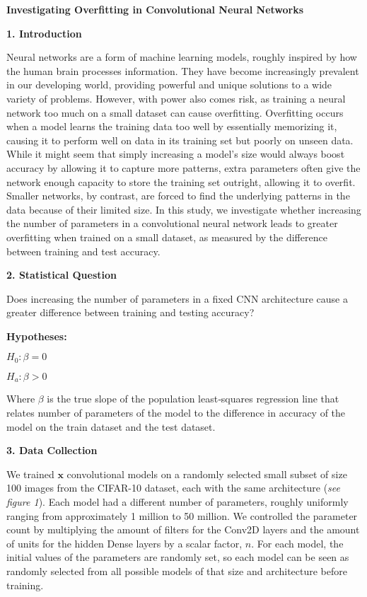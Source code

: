 \documentclass[12pt]{article}
\begin{document}
    \centerline{\textbf{Investigating Overfitting in Convolutional Neural Networks}}

    \noindent\textbf{1. Introduction}

    Neural networks are a form of machine learning models, roughly inspired by how the human brain
    processes information. They have become increasingly prevalent in our developing world, providing
    powerful and unique solutions to a wide variety of problems. However, with power also comes risk,
    as training a neural network too much on a small dataset can cause overfitting. Overfitting occurs
    when a model learns the training data too well by essentially memorizing it, causing it to perform
    well on data in its training set but poorly on unseen data. While it might seem that simply
    increasing a model’s size would always boost accuracy by allowing it to capture more patterns,
    extra parameters often give the network enough capacity to store the training set outright, allowing
    it to overfit. Smaller networks, by contrast, are forced to find the underlying patterns in the data
    because of their limited size. In this study, we investigate whether increasing the number of parameters
    in a convolutional neural network leads to greater overfitting when trained on a small dataset, as
    measured by the difference between training and test accuracy.

    \noindent\textbf{2. Statistical Question}

    Does increasing the number of parameters in a fixed CNN architecture cause a greater difference
    between training and testing accuracy?

    \noindent\textbf{Hypotheses:}\newline
    \centerline{$H_0: \beta = 0$} \newline
    \centerline{$H_a: \beta > 0$} \newline
    Where $\beta$ is the true slope of the population least‐squares regression line that relates number
    of parameters of the model to the difference in accuracy of the model on the train dataset and the
    test dataset.

    \noindent\textbf{3. Data Collection}

    We trained $\mathbf{x}$ convolutional models on a randomly selected small subset of size 100 images
    from the CIFAR-10 dataset, each with the same architecture (\textit{see figure 1}). Each model had
    a different number of parameters, roughly uniformly ranging from approximately 1 million to 50 million.
    We controlled the parameter count by multiplying the amount of filters for the Conv2D layers and the amount of units
    for the hidden Dense layers by a scalar factor, $n$.
    For each model, the initial values of the parameters are randomly set, so each model can be seen as randomly
    selected from all possible models of that size and architecture before training.
\end{document}
